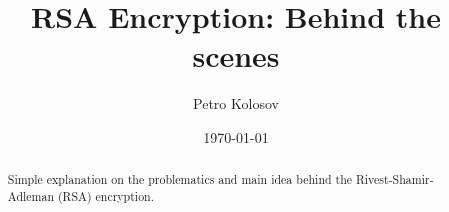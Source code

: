 \documentclass[12pt,letterpaper,oneside,reqno]{amsart}
\title[RSA Encryption: Behind the scenes]{RSA Encryption: Behind the scenes}
\author[Petro Kolosov]{Petro Kolosov}
\date{\today}
\begin{document}
    \begin{abstract}
        Simple explanation on the problematics and main idea behind the Rivest-Shamir-Adleman (RSA) encryption.
    \end{abstract}
    \maketitle
    \tableofcontents


%
%
%
%
%
%
%
%
\end{document}
